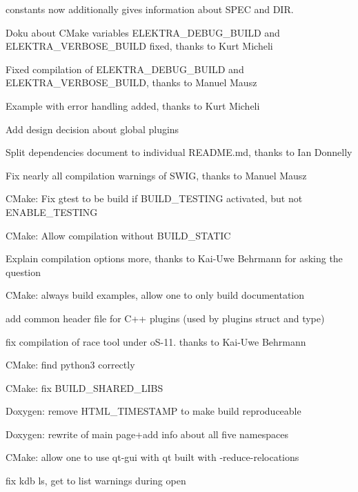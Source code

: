 \begin{DoxyItemize}
\item constants now additionally gives information about S\+P\+EC and D\+IR.
\item Doku about C\+Make variables {\ttfamily E\+L\+E\+K\+T\+R\+A\+\_\+\+D\+E\+B\+U\+G\+\_\+\+B\+U\+I\+LD} and {\ttfamily E\+L\+E\+K\+T\+R\+A\+\_\+\+V\+E\+R\+B\+O\+S\+E\+\_\+\+B\+U\+I\+LD} fixed, thanks to Kurt Micheli
\item Fixed compilation of {\ttfamily E\+L\+E\+K\+T\+R\+A\+\_\+\+D\+E\+B\+U\+G\+\_\+\+B\+U\+I\+LD} and {\ttfamily E\+L\+E\+K\+T\+R\+A\+\_\+\+V\+E\+R\+B\+O\+S\+E\+\_\+\+B\+U\+I\+LD}, thanks to Manuel Mausz
\item Example with error handling added, thanks to Kurt Micheli
\item Add design decision about global plugins
\item Split dependencies document to individual R\+E\+A\+D\+M\+E.\+md, thanks to Ian Donnelly
\item Fix nearly all compilation warnings of S\+W\+IG, thanks to Manuel Mausz
\item C\+Make\+: Fix gtest to be build if {\ttfamily B\+U\+I\+L\+D\+\_\+\+T\+E\+S\+T\+I\+NG} activated, but not {\ttfamily E\+N\+A\+B\+L\+E\+\_\+\+T\+E\+S\+T\+I\+NG}
\item C\+Make\+: Allow compilation without B\+U\+I\+L\+D\+\_\+\+S\+T\+A\+T\+IC
\item Explain compilation options more, thanks to Kai-\/\+Uwe Behrmann for asking the question
\item C\+Make\+: always build examples, allow one to only build documentation
\item add common header file for C++ plugins (used by plugins struct and type)
\item fix compilation of race tool under o\+S-\/11. thanks to Kai-\/\+Uwe Behrmann
\item C\+Make\+: find python3 correctly
\item C\+Make\+: fix B\+U\+I\+L\+D\+\_\+\+S\+H\+A\+R\+E\+D\+\_\+\+L\+I\+BS
\item Doxygen\+: remove {\ttfamily H\+T\+M\+L\+\_\+\+T\+I\+M\+E\+S\+T\+A\+MP} to make build reproduceable
\item Doxygen\+: rewrite of main page+add info about all five namespaces
\item C\+Make\+: allow one to use qt-\/gui with qt built with -\/reduce-\/relocations
\item fix kdb ls, get to list warnings during open

\end{DoxyItemize}
